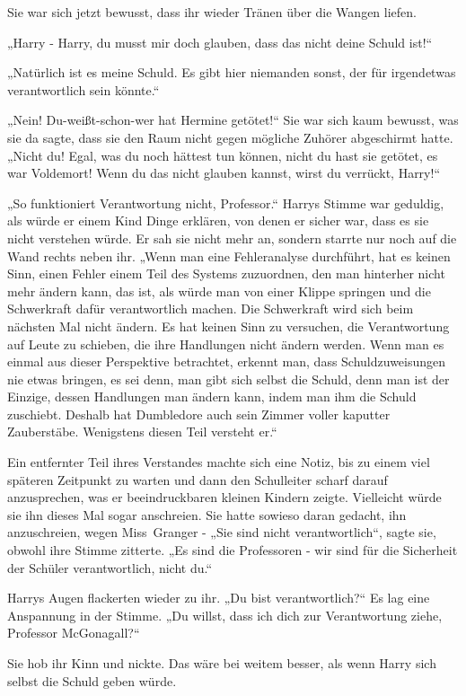 {Sie war sich jetzt bewusst, dass ihr wieder Tränen über die Wangen liefen.

„Harry - Harry, du musst mir doch glauben, dass das nicht deine Schuld ist!“

„Natürlich ist es meine Schuld. Es gibt hier niemanden sonst, der für irgendetwas verantwortlich sein könnte.“

„Nein! Du-weißt-schon-wer hat Hermine getötet!“ Sie war sich kaum bewusst, was sie da sagte, dass sie den Raum nicht gegen mögliche Zuhörer abgeschirmt hatte. „Nicht du! Egal, was du noch hättest tun können, nicht du hast sie getötet, es war Voldemort! Wenn du das nicht glauben kannst, wirst du verrückt, Harry!“

„So funktioniert Verantwortung nicht, Professor.“ Harrys Stimme war geduldig, als würde er einem Kind Dinge erklären, von denen er sicher war, dass es sie nicht verstehen würde. Er sah sie nicht mehr an, sondern starrte nur noch auf die Wand rechts neben ihr. „Wenn man eine Fehleranalyse durchführt, hat es keinen Sinn, einen Fehler einem Teil des Systems zuzuordnen, den man hinterher nicht mehr ändern kann, das ist, als würde man von einer Klippe springen und die Schwerkraft dafür verantwortlich machen. Die Schwerkraft wird sich beim nächsten Mal nicht ändern. Es hat keinen Sinn zu versuchen, die Verantwortung auf Leute zu schieben, die ihre Handlungen nicht ändern werden. Wenn man es einmal aus dieser Perspektive betrachtet, erkennt man, dass Schuldzuweisungen nie etwas bringen, es sei denn, man gibt sich selbst die Schuld, denn man ist der Einzige, dessen Handlungen man ändern kann, indem man ihm die Schuld zuschiebt. Deshalb hat Dumbledore auch sein Zimmer voller kaputter Zauberstäbe. Wenigstens diesen Teil versteht er.“

Ein entfernter Teil ihres Verstandes machte sich eine Notiz, bis zu einem viel späteren Zeitpunkt zu warten und dann den Schulleiter scharf darauf anzusprechen, was er beeindruckbaren kleinen Kindern zeigte. Vielleicht würde sie ihn dieses Mal sogar anschreien. Sie hatte sowieso daran gedacht, ihn anzuschreien, wegen Miss~Granger - „Sie sind nicht verantwortlich“, sagte sie, obwohl ihre Stimme zitterte. „Es sind die Professoren - wir sind für die Sicherheit der Schüler verantwortlich, nicht du.“

Harrys Augen flackerten wieder zu ihr. „Du bist verantwortlich?“ Es lag eine Anspannung in der Stimme. „Du willst, dass ich dich zur Verantwortung ziehe, Professor McGonagall?“

Sie hob ihr Kinn und nickte. Das wäre bei weitem besser, als wenn Harry sich selbst die Schuld geben würde.

}
